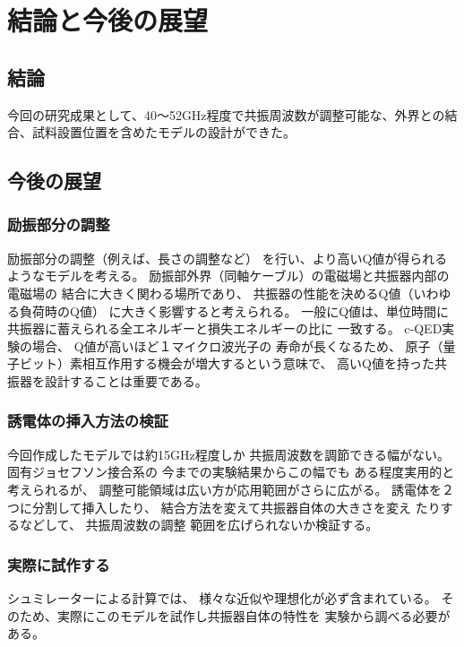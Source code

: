 \chapter{結論と今後の展望}
\section{結論}
今回の研究成果として、40〜52GHz程度で共振周波数が調整可能な、外界との結合、試料設置位置を含めたモデルの設計ができた。


\section{今後の展望}

\subsection*{励振部分の調整}
励振部分の調整（例えば、長さの調整など）
を行い、より高いQ値が得られるようなモデルを考える。
励振部外界（同軸ケーブル）の電磁場と共振器内部の電磁場の
結合に大きく関わる場所であり、
共振器の性能を決めるQ値（いわゆる負荷時のQ値）
に大きく影響すると考えられる。
一般にQ値は、単位時間に共振器に蓄えられる全エネルギーと損失エネルギーの比に
一致する。
c-QED実験の場合、
Q値が高いほど１マイクロ波光子の
寿命が長くなるため、
原子（量子ビット）素相互作用する機会が増大するという意味で、
高いQ値を持った共振器を設計することは重要である。

\subsection*{誘電体の挿入方法の検証}
今回作成したモデルでは約15GHz程度しか
共振周波数を調節できる幅がない。
固有ジョセフソン接合系の
今までの実験結果からこの幅でも
ある程度実用的と考えられるが、
調整可能領域は広い方が応用範囲がさらに広がる。
誘電体を２つに分割して挿入したり、
結合方法を変えて共振器自体の大きさを変え
たりするなどして、
共振周波数の調整
範囲を広げられないか検証する。

\subsection*{実際に試作する}
シュミレーターによる計算では、
様々な近似や理想化が必ず含まれている。
そのため、実際にこのモデルを試作し共振器自体の特性を
実験から調べる必要がある。

